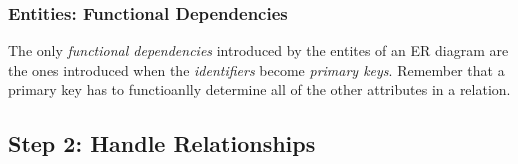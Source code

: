 \documentclass{report}
\begin{document}
\subsubsection{Entities: Functional Dependencies}
The only \textit{functional dependencies} introduced by the entites of an ER diagram are the ones introduced when the \textit{identifiers} become \textit{primary keys}. Remember that a primary key has to functioanlly determine all of the other attributes in a relation.
\subsection{Step 2: Handle Relationships}
\end{document}

